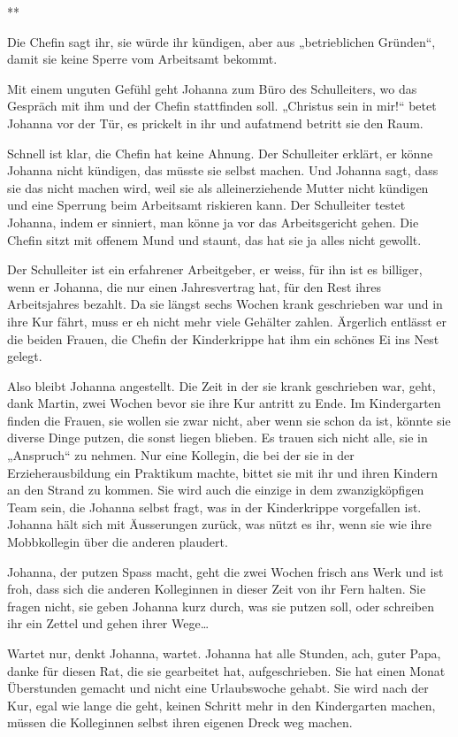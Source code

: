 \documentclass[10pt,titlepage,a5paper]{book}
\newcommand{\sterne}{\par{\centering ***\par}}
\begin{document}
\sterne

Die Chefin sagt ihr, sie würde ihr kündigen, aber aus „betrieblichen Gründen“, damit sie keine Sperre vom Arbeitsamt bekommt. 

Mit einem unguten Gefühl geht Johanna zum Büro des Schulleiters, wo das Gespräch mit ihm und der Chefin stattfinden soll. „Christus sein in mir!“ betet Johanna vor der Tür, es prickelt in ihr und aufatmend betritt sie den Raum.

Schnell ist klar, die Chefin hat keine Ahnung. Der Schulleiter erklärt, er könne Johanna nicht kündigen, das müsste sie selbst machen. Und Johanna  sagt, dass sie das nicht machen wird, weil sie als alleinerziehende Mutter nicht kündigen und eine Sperrung beim Arbeitsamt riskieren kann. Der Schulleiter testet Johanna, indem er sinniert, man könne ja vor das Arbeitsgericht gehen. Die Chefin sitzt mit offenem Mund und staunt, das hat sie ja alles nicht gewollt.

Der Schulleiter ist ein erfahrener Arbeitgeber, er weiss, für ihn ist es billiger, wenn er Johanna, die nur einen Jahresvertrag hat, für den Rest ihres Arbeitsjahres bezahlt. Da sie längst sechs Wochen krank geschrieben war und in ihre Kur fährt, muss er eh nicht mehr viele Gehälter zahlen. Ärgerlich entlässt er die beiden Frauen, die Chefin der Kinderkrippe hat ihm ein schönes Ei ins Nest gelegt. 

Also bleibt Johanna angestellt. Die Zeit in der sie krank geschrieben war, geht, dank Martin, zwei Wochen bevor sie ihre Kur antritt zu Ende. Im Kindergarten finden die Frauen, sie wollen sie zwar nicht, aber wenn sie schon da ist, könnte sie diverse Dinge putzen, die sonst liegen blieben. Es trauen sich nicht alle, sie in „Anspruch“ zu nehmen. Nur eine Kollegin, die bei der sie in der Erzieherausbildung ein Praktikum machte, bittet sie mit ihr und ihren Kindern an den Strand zu kommen. Sie wird auch die einzige in dem zwanzigköpfigen Team sein, die Johanna selbst fragt, was in der Kinderkrippe vorgefallen ist. Johanna hält sich mit Äusserungen zurück, was nützt es ihr, wenn sie wie ihre Mobbkollegin über die anderen plaudert.

Johanna, der putzen Spass macht, geht die zwei Wochen frisch ans Werk und ist froh, dass sich die anderen Kolleginnen in dieser Zeit von ihr Fern halten. Sie fragen nicht, sie geben Johanna kurz durch, was sie putzen soll, oder schreiben ihr ein Zettel und gehen ihrer Wege\dots 

Wartet nur, denkt Johanna, wartet. Johanna hat alle Stunden, ach, guter Papa, danke für diesen Rat, die sie gearbeitet hat, aufgeschrieben. Sie hat einen Monat Überstunden gemacht und nicht eine Urlaubswoche gehabt. Sie wird nach der Kur, egal wie lange die geht, keinen Schritt mehr in den Kindergarten machen, müssen die Kolleginnen selbst ihren eigenen Dreck weg machen.
\end{document}
